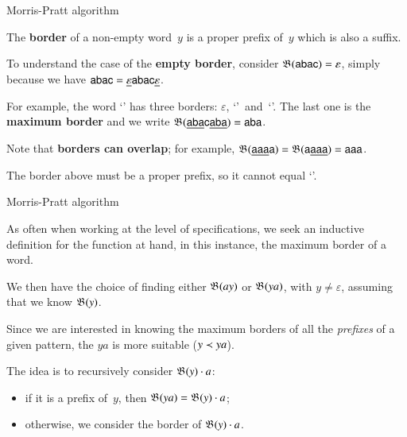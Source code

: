 %
\begin{frame}{Morris-Pratt algorithm}

The \textbf{border} of a non\hyp{}empty word~\(y\) is a proper prefix
of~\(y\) which is also a suffix.

\bigskip

To understand the case of the \textbf{empty border}, consider
\(\mathfrak{B}^{}(\textsf{abac}) = \varepsilon\), simply because we have
\(\textsf{abac} =
\underline{\varepsilon}\textsf{abac}\underline{\varepsilon}\).

\bigskip

For example, the word `' has three borders:
\(\varepsilon\), `'~and~`'. The last one is the
\textbf{maximum border} and we write
\(\mathfrak{B}^{}(\underline{\textsf{aba}}\textsf{c}\underline{\textsf{aba}}) =
\textsf{aba}\).

\bigskip

Note that \textbf{borders can overlap}; for example,
\(\mathfrak{B}^{}(\underline{\textsf{aaa}}\textsf{a}) =
\mathfrak{B}^{}(\textsf{a}\underline{\textsf{aaa}}) = \textsf{aaa}\).

\bigskip

The border above must be a proper prefix, so it cannot equal
`'.

\end{frame}

%
\begin{frame}{Morris-Pratt algorithm}

As often when working at the level of specifications, we seek an
inductive definition for the function at hand, in this instance, the
maximum border of a word.

\bigskip

We then have the choice of finding either \(\mathfrak{B}^{}(ay)\) or
\(\mathfrak{B}^{}(ya)\), with \(y \neq \varepsilon\), assuming that we know
\(\mathfrak{B}^{}(y)\).

\bigskip

Since we are interested in knowing the maximum borders of all the
\emph{prefixes} of a given pattern, the \(ya\) is more suitable (\(y
\mathrel{\prec} ya\)).

\bigskip

The idea is to recursively consider \(\mathfrak{B}^{}(y) \cdot a\):

\begin{itemize}

  \item if it is a prefix of~\(y\), then \(\mathfrak{B}^{}(ya) =
    \mathfrak{B}^{}(y) \cdot a\);

  \item otherwise, we consider the border of \(\mathfrak{B}^{}(y) \cdot a\).

\end{itemize}

\end{frame}

